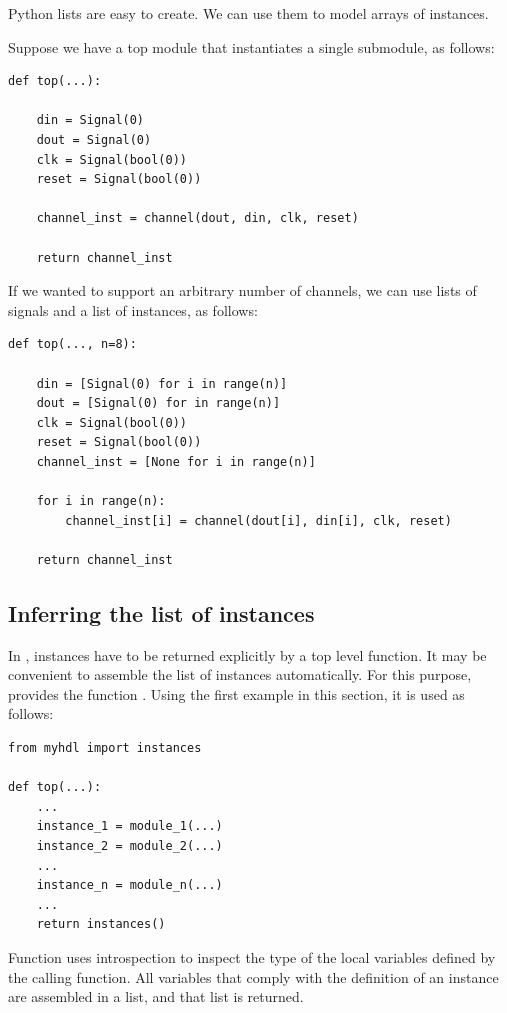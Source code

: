 Python lists are easy to create. We can use them
to model arrays of instances. 

Suppose we have a top module that instantiates a
single  submodule, as follows:

\begin{verbatim}
def top(...):

    din = Signal(0)
    dout = Signal(0)
    clk = Signal(bool(0))
    reset = Signal(bool(0))

    channel_inst = channel(dout, din, clk, reset)

    return channel_inst 
\end{verbatim}

If we wanted to support an arbitrary number of channels,
we can use lists of signals and a list of instances,
as follows:

\begin{verbatim}
def top(..., n=8):

    din = [Signal(0) for i in range(n)]
    dout = [Signal(0) for in range(n)]
    clk = Signal(bool(0))
    reset = Signal(bool(0))
    channel_inst = [None for i in range(n)]

    for i in range(n):
        channel_inst[i] = channel(dout[i], din[i], clk, reset)

    return channel_inst
\end{verbatim}

\subsection{Inferring the list of instances \label{model-infer-instlist}}

In \myhdl{}, instances have to be returned explicitly by
a top level function. It may be convenient to assemble 
the list of instances automatically. For this purpose,
\myhdl  provides the function .
Using the first example in this section, it is used as follows:

\begin{verbatim}
from myhdl import instances

def top(...):
    ...
    instance_1 = module_1(...)
    instance_2 = module_2(...)
    ...
    instance_n = module_n(...)
    ...
    return instances()
\end{verbatim}

Function  uses introspection to inspect the type
of the local variables defined by the calling function. All variables
that comply with the definition of an instance are assembled in
a list, and that list is returned.

